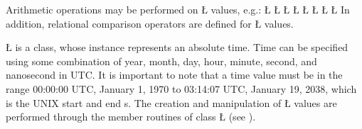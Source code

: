 \documentclass[openright,twoside]{report}
\begin{document}
Arithmetic operations may be performed on \LGinlinetrue\LGbegin\lgrinde\L{}\endlgrinde\LGend{} values, e.g.:
\LGinlinefalse\LGbegin\lgrinde
\L{}
\L{}
\L{}
\CE{}\L{}
\CE{}\L{}
\CE{}\L{}
\CE{}\L{}
\CE{}\L{}
\CE{}\endlgrinde\LGend
In addition, relational comparison operators are defined for \LGinlinetrue\LGbegin\lgrinde\L{}\endlgrinde\LGend{} values.

\LGinlinetrue\LGbegin\lgrinde\L{}\endlgrinde\LGend{} is a class, whose instance represents an absolute time.
Time can be specified using some combination of year, month, day, hour, minute, second, and nanosecond in UTC.
It is important to note that a time value must be in the range 00:00:00 UTC, January 1, 1970 to 03:14:07 UTC, January 19, 2038, which is the UNIX start and end s.
The creation and manipulation of \LGinlinetrue\LGbegin\lgrinde\L{}\endlgrinde\LGend{} values are performed through the member routines of class \LGinlinetrue\LGbegin\lgrinde\L{}\endlgrinde\LGend{} (see ).
\end{document}
